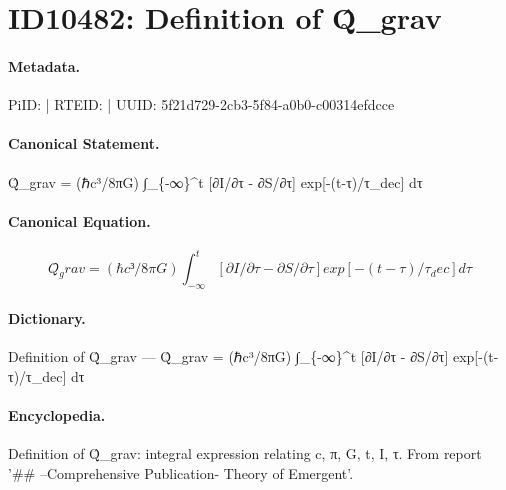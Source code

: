 \section*{ID10482: Definition of Q̂\_grav}
\paragraph{Metadata.}
PiID:  | RTEID:  | UUID: 5f21d729-2cb3-5f84-a0b0-c00314efdcce

\paragraph{Canonical Statement.}
Q̂\_grav = (ℏc³/8πG) ∫\_\{-∞\}\textasciicircum{}t [∂I/∂τ - ∂S/∂τ] exp[-(t-τ)/τ\_dec] dτ

\paragraph{Canonical Equation.}
\[
Q̂_grav = (ℏc³/8πG) ∫_{-∞}^t [∂I/∂τ - ∂S/∂τ] exp[-(t-τ)/τ_dec] dτ
\]

\paragraph{Dictionary.}
Definition of Q̂\_grav — Q̂\_grav = (ℏc³/8πG) ∫\_\{-∞\}\textasciicircum{}t [∂I/∂τ - ∂S/∂τ] exp[-(t-τ)/τ\_dec] dτ

\paragraph{Encyclopedia.}
Definition of Q̂\_grav: integral expression relating c, π, G, t, I, τ. From report '\#\# --Comprehensive Publication- Theory of Emergent'.
